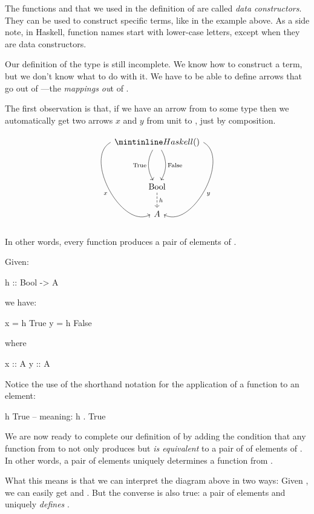 \documentclass[DaoFP]{subfiles}
\begin{document}
The functions  and  that we used in the definition of  are called \emph{data constructors}. They can be used to construct specific terms, like in the example above. As a side note, in Haskell, function names start with lower-case letters, except when they are data constructors. 

Our definition of the type  is still incomplete. We know how to construct a  term, but we don't know what to do with it. We have to be able to define arrows that go out of ---the \emph{mappings ou}t of . 

The first observation is that, if we have an arrow  from  to some type  then we automatically get two arrows $x$ and $y$ from unit to , just by composition.

\[
 \begin{tikzcd}
 \hask{()}
 \arrow[dd, bend right, "\text{True}"']
 \arrow[dd, bend left, "\text{False}"]
  \arrow[ddd, bend right =90, "x"']
 \arrow[ddd, bend left=90, "y"]
\\
 \\
\text{Bool}
\arrow[d, dashed, "h"]
\\
A
 \end{tikzcd}
\]
In other words, every function  produces a pair of elements of .

Given:
\begin{haskell}
h :: Bool -> A
\end{haskell}
we have:
\begin{haskell}
x = h True
y = h False
\end{haskell}
where
\begin{haskell}
x :: A
y :: A
\end{haskell}
Notice the use of the shorthand notation for the application of a function to an element:
\begin{haskell}
h True -- meaning: h . True
\end{haskell}

We are now ready to complete our definition of  by adding the condition that any function from  to  not only produces but \emph{is equivalent} to a pair of of elements of . In other words, a pair of elements uniquely determines a function from . 

What this means is that we can interpret the diagram above in two ways: Given , we can easily get  and . But the converse is also true: a pair of elements  and  uniquely \emph{defines} .
\end{document}
